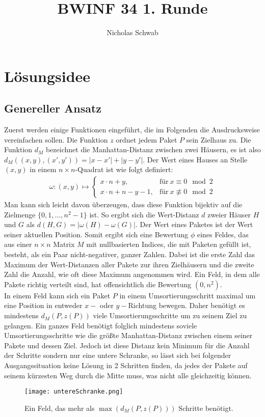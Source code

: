 \documentclass[12pt]{article}
\title{BWINF 34 1. Runde}
\author{Nicholas Schwab}
\begin{document}
\tableofcontents
\newpage
\section{Lösungsidee}
\subsection{Genereller Ansatz}
Zuerst werden einige Funktionen eingeführt, die im Folgenden die Ausdrucksweise vereinfachen sollen. Die Funktion $z$ ordnet jedem Paket $P$ sein Zielhaus zu. Die Funktion $d_M$ bezeichnet die Manhattan-Distanz \cite{2} zwischen zwei Häusern, es ist also $d_M((x,y), (x',y')) = |x-x'| + |y-y'|$. Der Wert eines Hauses an Stelle $(x,y)$ in einem $n\times n$-Quadrat ist wie folgt definiert:
\begin{align*}
 \omega: (x,y) \mapsto \begin{cases}
			  x\cdot n +y, &\mbox{für} ~ x \equiv 0 \mod 2 \\
			  x\cdot n + n -y -1, &\mbox{für}~ x \not\equiv 0 \mod 2
                       \end{cases}
\end{align*}
Man kann sich leicht davon überzeugen, dass diese Funktion bijektiv auf die Zielmenge $\{0, 1, \dots, n^2-1\}$ ist. So ergibt sich die Wert-Distanz $d$ zweier Häuser $H$ und $G$ als $d(H,G) = |\omega(H)-\omega(G)|$. Der Wert eines Paketes ist der Wert seiner aktuellen Position. Somit ergibt sich eine Bewertung $\phi$ eines Feldes, das aus einer $n\times n$ Matrix $M$ mit nullbasierten Indices, die mit Paketen gefüllt ist, besteht, als ein Paar nicht-negativer, ganzer Zahlen. Dabei ist die erste Zahl das Maximum der Wert-Distanzen aller Pakete zur ihren Zielhäusern und die zweite Zahl die Anzahl, wie oft diese Maximum angenommen wird. Ein Feld, in dem alle Pakete richtig verteilt sind, hat offensichtlich die Bewertung $(0, n^2)$. \\

In einem Feld kann sich ein Paket $P$ in einem Umsortierungsschritt maximal um eine Position in entweder $x-$ oder $y-$Richtung bewegen. Daher benötigt es mindestens $d_M(P, z(P))$ viele Umsortierungsschritte um zu seinem Ziel zu gelangen. Ein ganzes Feld benötigt folglich mindestens soviele Umsortierungsschritte wie die größte Manhattan-Distanz zwischen einem seiner Pakete und dessen Ziel. Jedoch ist diese Distanz kein Minimum für die Anzahl der Schritte sondern nur eine untere Schranke, so lässt sich bei folgender Ausgangssituation keine Lösung in 2 Schritten finden, da jedes der Pakete auf seinem kürzesten Weg durch die Mitte muss, was nicht alle gleichzeitig können.
\begin{figure}[h]
\centering
 \texttt{[image: untereSchranke.png]}
 \caption{Ein Feld, das mehr als $\max(d_M(P,z(P)))$ Schritte benötigt.}
\end{figure}
\end{document}
